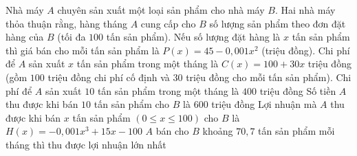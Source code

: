 \begin{ex}%
 Nhà máy $A$ chuyên sản xuất một loại sản phẩm cho nhà máy $B$. Hai nhà máy thỏa thuận rằng, hàng tháng $A$ cung cấp cho $B$ số lượng sản phẩm theo đơn đặt hàng của $B$ (tối đa $100$ tấn sản phẩm). Nếu số lượng đặt hàng là $x$ tấn sản phẩm thì giá bán cho mỗi tấn sản phẩm là $P(x) = 45 - 0{,}001x^2$ (triệu đồng). Chi phí để $A$ sản xuất $x$ tấn sản phẩm trong một tháng là $C(x) = 100 + 30x$ triệu đồng (gồm $100$ triệu đồng chi phí cố định và $30$ triệu đồng cho mỗi tấn sản phẩm).
 \choiceTF
{\True Chi phí để $A$ sản xuất $10$ tấn sản phẩm trong một tháng là $400$ triệu đồng}
{Số tiền $A$ thu được khi bán $10$ tấn sản phẩm cho $B$ là $600$ triệu đồng}
{\True Lợi nhuận mà $A$ thu được khi bán $x$ tấn sản phẩm $(0 \leq x \leq 100)$ cho $B$ là $H(x) = -0,001x^3 + 15x - 100$}
{\True $A$ bán cho $B$ khoảng $70{,}7$ tấn sản phẩm mỗi tháng thì thu được lợi nhuận lớn nhất}
\end{ex}

